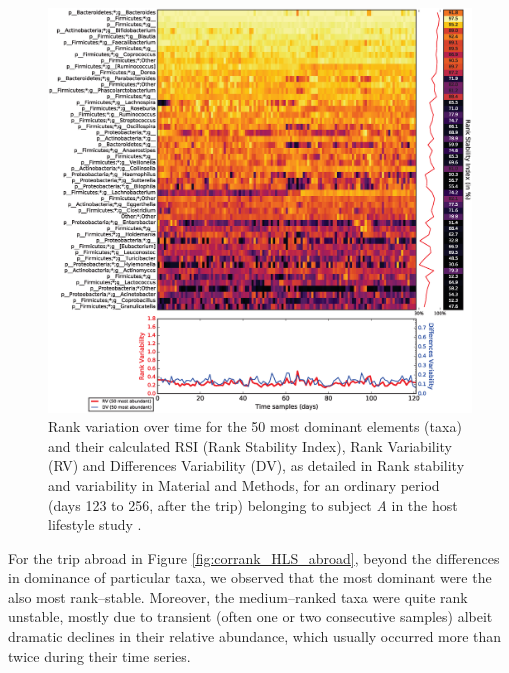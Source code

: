 \begin{figure}
	\centering
	\includegraphics[width=1.0\textwidth]{figs/Fig5.eps}
	\caption{Rank variation over time for the 50 most dominant elements (taxa) and their calculated RSI (Rank Stability Index), Rank Variability (RV) and Differences Variability (DV), as detailed in Rank stability and variability in Material and Methods, for an ordinary period (days 123 to 256, after the trip) belonging to subject \emph{A} in the host lifestyle study \cite{hostlife}.}
	\label{fig:corrank_HLS_returned}
\end{figure}

For the trip abroad in Figure \ref{fig:corrank_HLS_abroad}, beyond the differences in dominance of particular taxa, we observed that the most dominant were the also most rank--stable. Moreover, the medium--ranked taxa were quite rank unstable, mostly due to transient (often one or two consecutive samples) albeit dramatic declines in their relative abundance, which usually occurred more than twice during their time series.

